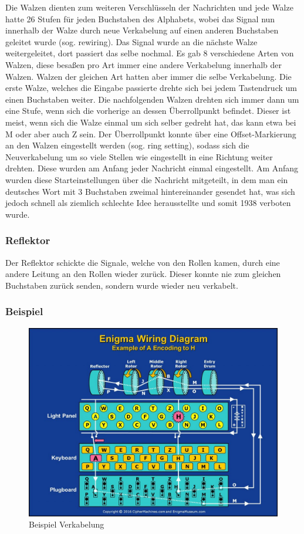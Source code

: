 Die Walzen dienten zum weiteren Verschlüsseln der Nachrichten und jede Walze hatte 26 Stufen für jeden Buchstaben des Alphabets, wobei das Signal nun innerhalb der Walze durch neue Verkabelung auf einen anderen Buchstaben geleitet wurde (sog. rewiring). Das Signal wurde an die nächste Walze weitergeleitet, dort passiert das selbe nochmal. Es gab 8 verschiedene Arten von Walzen, diese besaßen pro Art immer eine andere Verkabelung innerhalb der Walzen. Walzen der gleichen Art hatten aber immer die selbe Verkabelung. Die erste Walze, welches die Eingabe passierte drehte sich bei jedem Tastendruck um einen Buchstaben weiter. Die nachfolgenden Walzen drehten sich immer dann um eine Stufe, wenn sich die vorherige an dessen Überrollpunkt befindet. Dieser ist meist, wenn sich die Walze einmal um sich selber gedreht hat, das kann etwa bei M oder aber auch Z sein. Der Überrollpunkt konnte über eine Offset-Markierung an den Walzen eingestellt werden (sog. ring setting), sodass sich die Neuverkabelung um so viele Stellen wie eingestellt in eine Richtung weiter drehten. Diese wurden am Anfang jeder Nachricht einmal eingestellt. Am Anfang wurden diese Starteinstellungen über die Nachricht mitgeteilt, in dem man ein deutsches Wort mit 3 Buchstaben zweimal hintereinander gesendet hat, was sich jedoch schnell als ziemlich schlechte Idee herausstellte und somit 1938 verboten wurde.

\subsubsection{Reflektor}
Der Reflektor schickte die Signale, welche von den Rollen kamen, durch eine andere Leitung an den Rollen wieder zurück. Dieser konnte nie zum gleichen Buchstaben zurück senden, sondern wurde wieder neu verkabelt.

\subsubsection{Beispiel}

\begin{figure}[H]
	\centering
	\includegraphics[scale=0.3]{Enigma_Maschine_Beispiel.jpg}
	\caption{Beispiel Verkabelung}
	\label{fig:enigma}
\end{figure}

